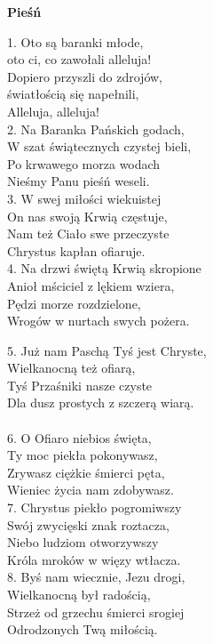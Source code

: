 \documentclass[10pt,a5paper]{book}
\newcommand{\oremus}[3]{\medskip\centerline{\textbf{#1}}\medskip
	\begin{sloppypar}
		\begin{paracol}{2}
			\setlength{\columnsep}{0em}
			\begin{leftcolumn}
				#2
			\end{leftcolumn}
			\begin{rightcolumn}
				#3
			\end{rightcolumn}
		\end{paracol}
	\end{sloppypar}}
\begin{document}
\oremus{Pieśń}{
	1. Oto są baranki młode,\\
	oto ci, co zawołali alleluja!\\
	Dopiero przyszli do zdrojów,\\
	światłością się napełnili,  \\
	Alleluja, alleluja!\\

	2. Na Baranka Pańskich godach,\\
	W szat świątecznych czystej bieli,  \\
	Po krwawego morza wodach\\
	Nieśmy Panu pieśń weseli.\\

	3. W swej miłości wiekuistej\\
	On nas swoją Krwią częstuje,\\
	Nam też Ciało swe przeczyste\\
	Chrystus kapłan ofiaruje.\\

	4. Na drzwi świętą Krwią skropione\\
	Anioł mściciel z lękiem wziera,\\
	Pędzi morze rozdzielone,\\
	Wrogów w nurtach swych pożera.}{
	5. Już nam Paschą Tyś jest Chryste,\\
	Wielkanocną też ofiarą,\\
	Tyś Przaśniki nasze czyste \\
	Dla dusz prostych z szczerą wiarą.\\ \\

	6. O Ofiaro niebios święta,\\
	Ty moc piekła pokonywasz,\\
	Zrywasz ciężkie śmierci pęta,\\
	Wieniec życia nam zdobywasz. \\

	7. Chrystus piekło pogromiwszy\\
	Swój zwycięski znak roztacza,\\
	Niebo ludziom otworzywszy\\
	Króla mroków w więzy wtłacza.\\

	8. Byś nam wiecznie, Jezu drogi, \\
	Wielkanocną był radością,\\
	Strzeż od grzechu śmierci srogiej \\
	Odrodzonych Twą miłością.}
\end{document}
